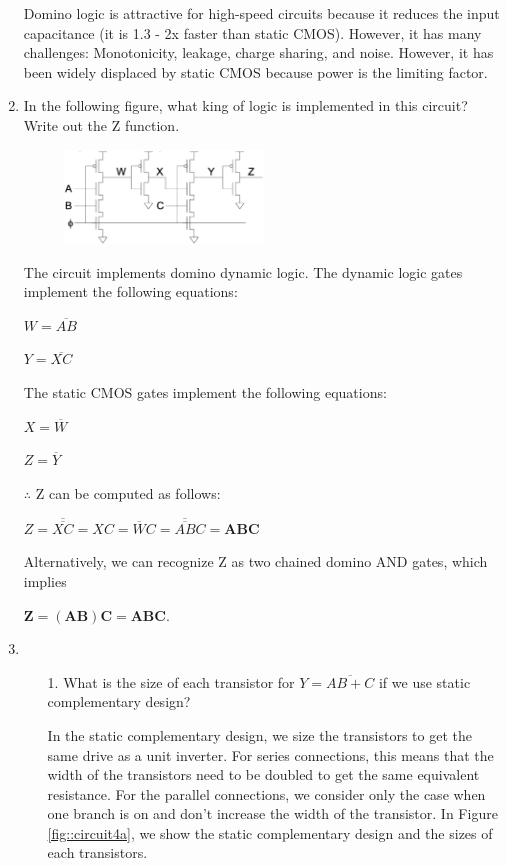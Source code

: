 \documentclass[fleqn]{article}
\begin{document}
\begin{enumerate}
		Domino logic is attractive for high-speed circuits because it reduces the input capacitance (it is 1.3 - 2x faster than static CMOS). However, it has many challenges: Monotonicity, leakage, charge sharing, and noise. However, it has been widely displaced by static CMOS because power is the limiting factor.
		
		\item In the following figure, what king of logic is implemented in this circuit? Write out the Z function.
		
			\begin{figure}[H]
				\centerline{\includegraphics[width=0.5\textwidth]{circuit_question3.png}}
				\label{fig::circuit_question3}
			\end{figure}

			The circuit implements domino dynamic logic. The dynamic logic gates implement the following equations:
			
			$W = \overline{AB}$
			
			$Y = \overline{XC}$
			
			The static CMOS gates implement the following equations:
			
			$X = \overline{W}$
			
			$Z = \overline{Y}$
			
			$\therefore$ Z can be computed as follows:
			
			$Z = \overline{\overline{XC}} = XC = \overline{W}C = \overline{\overline{AB}}C = \mathbf{ABC}$
			
			Alternatively, we can recognize Z as two chained domino AND gates, which implies
			
			$\mathbf{Z = (AB)C = ABC}$.
			
		\item ~
		
			\begin{enumerate}
			
			\item[1.] What is the size of each transistor for $Y = \overline{AB + C}$ if we use static complementary design?
			
			In the static complementary design, we size the transistors to get the same drive as a unit inverter. For series connections, this means that the width of the transistors need to be doubled to get the same equivalent resistance. For the parallel connections, we consider only the case when one branch is on and don't increase the width of the transistor. In Figure \ref{fig::circuit4a}, we show the static complementary design and the sizes of each transistors.
			

\end{enumerate}
\end{enumerate}
\end{document}
